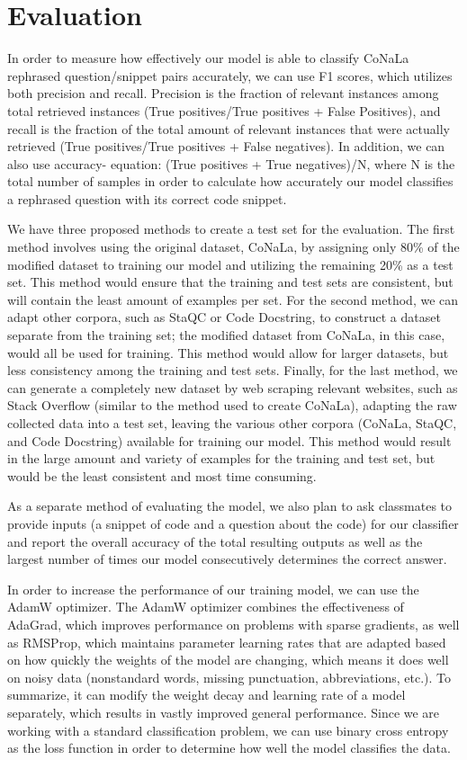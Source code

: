 \documentclass[11pt,a4paper]{article}
\begin{document}
\section{Evaluation}
In order to measure how effectively our model is able to classify
CoNaLa rephrased question/snippet pairs accurately, we can use F1
scores, which utilizes both precision and recall. Precision is the
fraction of relevant instances among total retrieved instances (True
positives/True positives + False Positives), and recall is the
fraction of the total amount of relevant instances that were actually
retrieved (True positives/True positives + False negatives). In
addition, we can also use accuracy- equation: (True positives + True
negatives)/N, where N is the total number of samples in order to
calculate how accurately our model classifies a rephrased question
with its correct code snippet.

We have three proposed methods to create a test set for the
evaluation. The first method involves using the original dataset,
CoNaLa, by assigning only 80\% of the modified dataset to training our
model and utilizing the remaining 20\% as a test set. This method
would ensure that the training and test sets are consistent, but will
contain the least amount of examples per set. For the second method,
we can adapt other corpora, such as StaQC or Code Docstring, to
construct a dataset separate from the training set; the modified
dataset from CoNaLa, in this case, would all be used for training.
This method would allow for larger datasets, but less consistency
among the training and test sets. Finally, for the last method, we can
generate a completely new dataset by web scraping relevant websites,
such as Stack Overflow (similar to the method used to create CoNaLa),
adapting the raw collected data into a test set, leaving the various
other corpora (CoNaLa, StaQC, and Code Docstring) available for
training our model. This method would result in the large amount and
variety of examples for the training and test set, but would be the
least consistent and most time consuming.

As a separate method of evaluating the model, we also plan to ask
classmates to provide inputs (a snippet of code and a question about
the code) for our classifier and report the overall accuracy of the
total resulting outputs as well as the largest number of times our
model consecutively determines the correct answer.

In order to increase the performance of our training model, we can use
the AdamW optimizer. The AdamW optimizer combines the effectiveness of
AdaGrad, which improves performance on problems with sparse gradients,
as well as RMSProp, which maintains parameter learning rates that are
adapted based on how quickly the weights of the model are changing,
which means it does well on noisy data (nonstandard words, missing
punctuation, abbreviations, etc.). To summarize, it can modify the
weight decay and learning rate of a model separately, which results in
vastly improved general performance. Since we are working with a
standard classification problem, we can use binary cross entropy as
the loss function in order to determine how well the model classifies
the data. 
\end{document}
